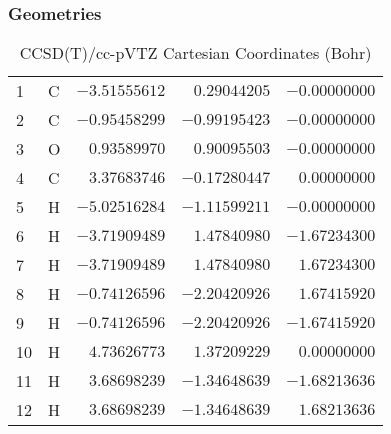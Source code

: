 \documentclass[10pt,oneside]{article}
\begin{document}
\clearpage

\subsection{\ \ \ }

\subsubsection*{Geometries}
\begin{table}[h!]
\centering
\caption{CCSD(T)/cc-pVTZ Cartesian Coordinates (Bohr)}
\begin{tabular}{llrrr}
1  & C  & $-3.51555612$ & $ 0.29044205$ & $-0.00000000$ \\
2  & C  & $-0.95458299$ & $-0.99195423$ & $-0.00000000$ \\
3  & O  & $ 0.93589970$ & $ 0.90095503$ & $-0.00000000$ \\
4  & C  & $ 3.37683746$ & $-0.17280447$ & $ 0.00000000$ \\
5  & H  & $-5.02516284$ & $-1.11599211$ & $-0.00000000$ \\
6  & H  & $-3.71909489$ & $ 1.47840980$ & $-1.67234300$ \\
7  & H  & $-3.71909489$ & $ 1.47840980$ & $ 1.67234300$ \\
8  & H  & $-0.74126596$ & $-2.20420926$ & $ 1.67415920$ \\
9  & H  & $-0.74126596$ & $-2.20420926$ & $-1.67415920$ \\
10 & H  & $ 4.73626773$ & $ 1.37209229$ & $ 0.00000000$ \\
11 & H  & $ 3.68698239$ & $-1.34648639$ & $-1.68213636$ \\
12 & H  & $ 3.68698239$ & $-1.34648639$ & $ 1.68213636$ \\
\end{tabular}
\end{table}
\end{document}

